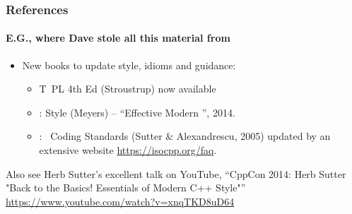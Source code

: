 \begin{frame}[fragile]
\frametitle{ References}
\framesubtitle{E.G., where Dave stole all this material from}
\begin{itemize}
  \item New books to update style, idioms and guidance:
    \begin{itemize}
    \item {} T\CC~PL 4th Ed (Stroustrup) now available

    \item {}: Style (Meyers) -- ``Effective Modern
      \CC'',  2014.

    \item {}: \CC\ Coding Standards (Sutter \&
    Alexandrescu, 2005) updated by an extensive website \url{https://isocpp.org/faq}.

    \end{itemize}
\end{itemize}
Also see Herb Sutter's excellent talk on YouTube, ``CppCon 2014: Herb Sutter "Back to the Basics!
Essentials of Modern C++ Style"'' \url{https://www.youtube.com/watch?v=xnqTKD8uD64}

\end{frame}






